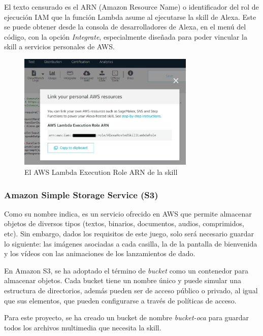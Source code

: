 El texto censurado es el ARN (Amazon Resource Name) o identificador del rol de ejecución IAM que la función Lambda asume al ejecutarse la skill de Alexa. Este se puede obtener desde la consola de desarrolladores de Alexa, en el menú del código, con la opción \textit{Integrate}, especialmente diseñada para poder vincular la skill a servicios personales de AWS.

\begin{figure}[H]
	\centering
	\includegraphics[width=0.75\textwidth]{imgs/aws-iam-4.png}
	\caption{El AWS Lambda Execution Role ARN de la skill}
	\label{fig:aws-iam-4}
\end{figure}

\subsubsection{Amazon Simple Storage Service (S3)}

Como su nombre indica, es un servicio ofrecido en AWS que permite almacenar objetos de diversos tipos (textos, binarios, documentos, audios, comprimidos, etc). Sin embargo, dados los requisitos de este juego, solo será necesario guardar lo siguiente: las imágenes asociadas a cada casilla, la de la pantalla de bienvenida y los vídeos con las animaciones de los lanzamientos de dado.

En Amazon S3, se ha adoptado el término de \textit{bucket} como un contenedor para almacenar objetos. Cada bucket tiene un nombre único y puede simular una estructura de directorios, además pueden ser de acceso público o privado, al igual que sus elementos, que pueden configurarse a través de políticas de acceso.

Para este proyecto, se ha creado un bucket de nombre \textit{bucket-oca} para guardar todos los archivos multimedia que necesita la skill.

